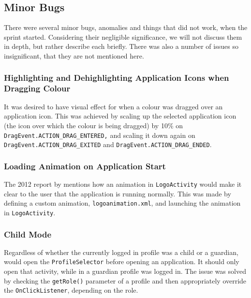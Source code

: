 \subsection{Minor Bugs}

There were several minor bugs, anomalies and things that did not work, when the sprint started.
Considering their negligible significance, we will not discuss them in depth, but rather describe each briefly.
There was also a number of issues so insignificant, that they are not mentioned here.

\subsubsection*{Highlighting and Dehighlighting Application Icons when Dragging Colour}
It was desired to have visual effect for when a colour was dragged over an application icon.
This was achieved by scaling up the selected application icon (the icon over which the colour is being dragged) by 10\% on \lstinline{DragEvent.ACTION_DRAG_ENTERED,} and scaling it down again on \lstinline{DragEvent.ACTION_DRAG_EXITED} and \lstinline{DragEvent.ACTION_DRAG_ENDED}.

\subsubsection*{Loading Animation on Application Start}
The 2012 report by \citet{launcher2012} mentions how an animation in \lstinline{LogoActivity} would make it clear to the user that the application is running normally.
This was made by defining a custom animation, \lstinline{logoanimation.xml}, and launching the animation in \lstinline{LogoActivity}.

\subsubsection*{Child Mode}
Regardless of whether the currently logged in profile was a child or a guardian, \launcher would open the \lstinline{ProfileSelector} before opening an application.
It should only open that activity, while in a guardian profile was logged in.
The issue was solved by checking the \lstinline{getRole()} parameter of a profile and then appropriately override the \lstinline{OnClickListener}, depending on the role. 


